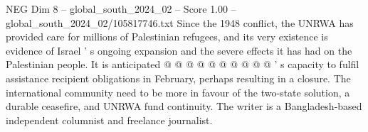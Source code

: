 \begin{textsample}{NEG Dim 8 – global\_south\_2024\_02 – Score 1.00 – global\_south\_2024\_02/105817746.txt}
Since the 1948 conflict, the UNRWA has provided care for millions of Palestinian refugees, and its very existence is evidence of Israel ' s ongoing expansion and the severe effects it has had on the Palestinian people.
It is anticipated @ @ @ @ @ @ @ @ @ @ ' s capacity to fulfil assistance recipient obligations in February, perhaps resulting in a closure.
The international community need to be more in favour of the two-state solution, a durable ceasefire, and UNRWA fund continuity.
The writer is a Bangladesh-based independent columnist and freelance journalist.

\end{textsample}
